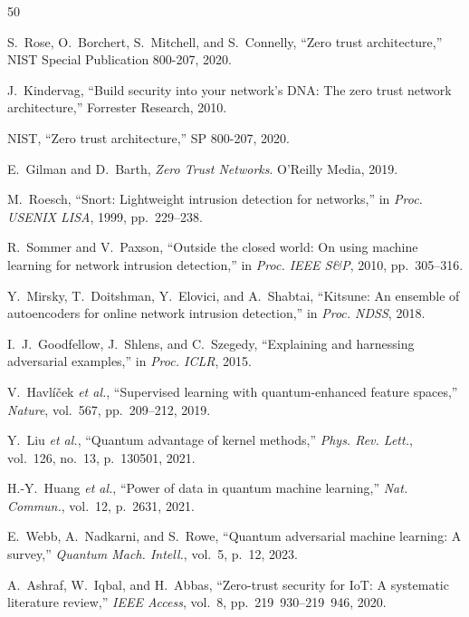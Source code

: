 \documentclass[twocolumn,a4paper,11pt]{article}
\begin{document}
\begin{thebibliography}{50}

S.~Rose, O.~Borchert, S.~Mitchell, and S.~Connelly,
``Zero trust architecture,'' NIST Special Publication 800-207, 2020.

J.~Kindervag,
``Build security into your network's DNA: The zero trust network architecture,''
Forrester Research, 2010.

NIST,
``Zero trust architecture,'' SP 800-207, 2020.

E.~Gilman and D.~Barth,
\textit{Zero Trust Networks}. O'Reilly Media, 2019.

M.~Roesch,
``Snort: Lightweight intrusion detection for networks,'' in
\textit{Proc. USENIX LISA}, 1999, pp.~229--238.

R.~Sommer and V.~Paxson,
``Outside the closed world: On using machine learning for network intrusion
detection,'' in \textit{Proc. IEEE S\&P}, 2010, pp.~305--316.

Y.~Mirsky, T.~Doitshman, Y.~Elovici, and A.~Shabtai,
``Kitsune: An ensemble of autoencoders for online network intrusion detection,''
in \textit{Proc. NDSS}, 2018.

I.~J.~Goodfellow, J.~Shlens, and C.~Szegedy,
``Explaining and harnessing adversarial examples,'' in
\textit{Proc. ICLR}, 2015.

V.~Havl\'{i}\v{c}ek \textit{et al.},
``Supervised learning with quantum-enhanced feature spaces,''
\textit{Nature}, vol.~567, pp.~209--212, 2019.

Y.~Liu \textit{et al.},
``Quantum advantage of kernel methods,''
\textit{Phys. Rev. Lett.}, vol.~126, no.~13, p.~130501, 2021.

H.-Y.~Huang \textit{et al.},
``Power of data in quantum machine learning,''
\textit{Nat. Commun.}, vol.~12, p.~2631, 2021.

E.~Webb, A.~Nadkarni, and S.~Rowe,
``Quantum adversarial machine learning: A survey,''
\textit{Quantum Mach. Intell.}, vol.~5, p.~12, 2023.

A.~Ashraf, W.~Iqbal, and H.~Abbas,
``Zero-trust security for IoT: A systematic literature review,''
\textit{IEEE Access}, vol.~8, pp.~219~930--219~946, 2020.


\end{thebibliography}
\end{document}
